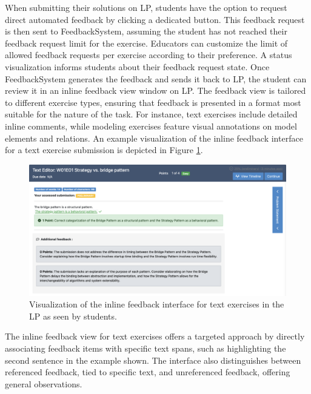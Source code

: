 \documentclass[sigconf,screen,review,anonymous]{acmart}
\begin{document}
When submitting their solutions on LP, students have the option to request direct automated feedback by clicking a dedicated button.
This feedback request is then sent to FeedbackSystem, assuming the student has not reached their feedback request limit for the exercise.
Educators can customize the limit of allowed feedback requests per exercise according to their preference.
A status visualization informs students about their feedback request state.
Once FeedbackSystem generates the feedback and sends it back to LP, the student can review it in an inline feedback view window on LP.
The feedback view is tailored to different exercise types, ensuring that feedback is presented in a format most suitable for the nature of the task.
For instance, text exercises include detailed inline comments, while modeling exercises feature visual annotations on model elements and relations.
An example visualization of the inline feedback interface for a text exercise submission is depicted in Figure \ref{fig:Artemis-feedback-visualization}.

\begin{figure}[htbp]
  \centering
  \includegraphics[width=\linewidth]{figures/text-feedback-viewer-cut.png}
  \vspace{-5mm}
  \caption{Visualization of the inline feedback interface for text exercises in the LP as seen by students.}
  \label{fig:Artemis-feedback-visualization}
  \vspace{-3mm}
\end{figure}

The inline feedback view for text exercises offers a targeted approach by directly associating feedback items with specific text spans, such as highlighting the second sentence in the example shown.
The interface also distinguishes between referenced feedback, tied to specific text, and unreferenced feedback, offering general observations.
\end{document}
